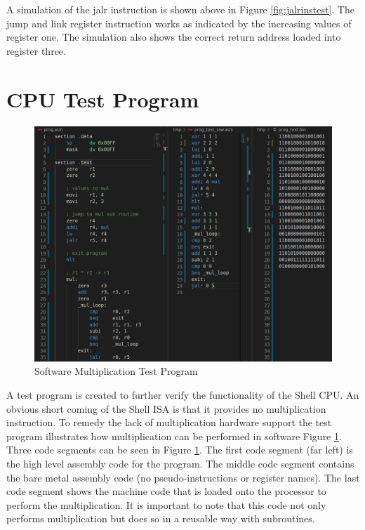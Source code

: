 \documentclass{article}
\begin{document}
		\begin{par}
			A simulation of the jalr instruction is shown above in Figure \ref{fig:jalrinstest}. The jump and link register instruction works as indicated by the increasing values of register one. The simulation also shows the correct return address loaded into register three. 
		\end{par}
		\newpage

\section{ CPU Test Program }

	\begin{figure}[H]
		\centering
		\includegraphics[width=5in]{img/program.png}
		\caption{Software Multiplication Test Program}
		\label{fig:tprog}
	\end{figure}

	A test program is created to further verify the functionality of the Shell CPU. An obvious short coming of the Shell ISA is that it provides no multiplication instruction. To remedy the lack of multiplication hardware support the test program illustrates how multiplication can be performed in software Figure \ref{fig:tprog}. Three code segments can be seen in Figure \ref{fig:tprog}. The first code segment (far left) is the high level assembly code for the program. The middle code segment contains the bare metal assembly code (no pseudo-instructions or register names). The last code segment shows the machine code that is loaded onto the processor to perform the multiplication. It is important to note that this code not only performs multiplication but does so in a reusable way with subroutines.  
	
\end{document}
